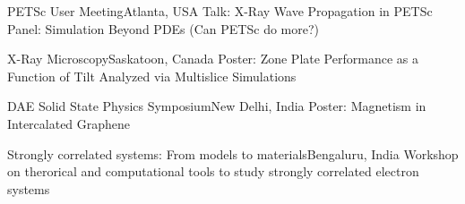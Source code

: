 {PETSc User Meeting}{Atlanta, USA}
{\newline Talk: X-Ray Wave Propagation in PETSc} 
{\newline Panel: Simulation Beyond PDEs (Can PETSc do more?)}
{}


{X-Ray Microscopy}{Saskatoon, Canada}
{\newline Poster: Zone Plate Performance as a Function of Tilt Analyzed via Multislice Simulations} 
{}
{}

{DAE Solid State Physics Symposium}{New Delhi, India}
{\newline Poster: Magnetism in Intercalated Graphene} 
{}
{}

{Strongly correlated systems: From models to materials}{Bengaluru, India}
{\newline Workshop on therorical and computational tools to study strongly correlated electron systems} 
{}
{}

